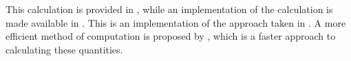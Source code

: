 %
%
%





This calculation is provided in \citet{hanleymcneil1982}, while an implementation of the calculation is made available in \citet{proc2011}.
This is an implementation of the approach taken in \citet{delong1988}.
%
A more efficient method of computation is proposed by \citet{sunxu2014}, which is a faster approach to calculating
these quantities.
%



